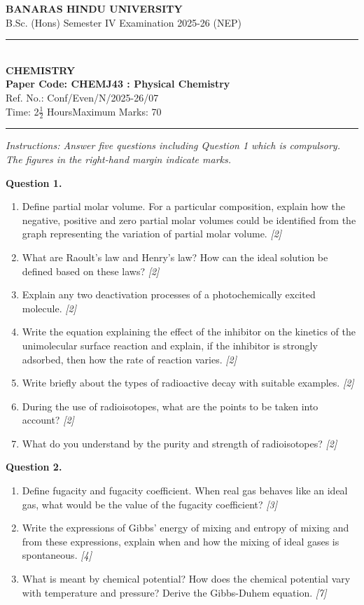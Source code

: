 \documentclass[11pt,a4paper]{article}
\newcommand{\pts}[1]{\hfill \textit{[#1]}}
\begin{document}
\begin{center}
  {\large\bfseries BANARAS HINDU UNIVERSITY}\\[2pt]
  {\normalsize B.Sc. (Hons) Semester IV Examination 2025-26 (NEP)}\\[6pt]
  \rule{0.8\linewidth}{0.5pt}\\[6pt]
  {\large\bfseries CHEMISTRY}\\[4pt]
  {\large\bfseries Paper Code: CHEMJ43 : Physical Chemistry}\\[2pt]
  {\small Ref. No.: Conf/Even/N/2025-26/07}\\[4pt]
  {\normalsize Time: 2$\frac{1}{2}$ Hours\hfill Maximum Marks: 70}
\end{center}

\rule{\linewidth}{0.4pt}

\smallskip

\noindent \textit{Instructions: Answer five questions including Question 1 which is compulsory. The figures in the right-hand margin indicate marks.}

\bigskip

\noindent \textbf{Question 1.}
\begin{enumerate}[label=(\alph*)]
  \item Define partial molar volume. For a particular composition, explain how the negative, positive and zero partial molar volumes could be identified from the graph representing the variation of partial molar volume. \pts{2}
  \item What are Raoult's law and Henry's law? How can the ideal solution be defined based on these laws? \pts{2}
  \item Explain any two deactivation processes of a photochemically excited molecule. \pts{2}
  \item Write the equation explaining the effect of the inhibitor on the kinetics of the unimolecular surface reaction and explain, if the inhibitor is strongly adsorbed, then how the rate of reaction varies. \pts{2}
  \item Write briefly about the types of radioactive decay with suitable examples. \pts{2}
  \item During the use of radioisotopes, what are the points to be taken into account? \pts{2}
  \item What do you understand by the purity and strength of radioisotopes? \pts{2}
\end{enumerate}

\bigskip

\noindent \textbf{Question 2.}
\begin{enumerate}[label=(\alph*)]
  \item Define fugacity and fugacity coefficient. When real gas behaves like an ideal gas, what would be the value of the fugacity coefficient? \pts{3}
  \item Write the expressions of Gibbs' energy of mixing and entropy of mixing and from these expressions, explain when and how the mixing of ideal gases is spontaneous. \pts{4}
  \item What is meant by chemical potential? How does the chemical potential vary with temperature and pressure? Derive the Gibbs-Duhem equation. \pts{7}
\end{enumerate}
\end{document}
